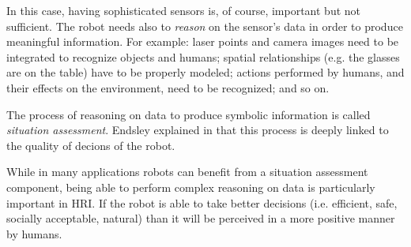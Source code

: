In this case, having sophisticated sensors is, of course, important but not sufficient. The robot needs also to \textit{reason} on the sensor's data in order to produce meaningful information. For example: laser points and camera images need to be integrated to recognize objects and humans; spatial relationships  (e.g. the glasses are on the table) have to be properly modeled; actions performed by humans, and their effects on the environment, need to be recognized; and so on. 

The process of reasoning on data to produce symbolic information is called \textit{situation assessment}. Endsley explained in \cite{endsley1995toward} that this process is deeply linked to the quality of  decions of the robot.

While in many applications robots can benefit from a situation assessment component, being able to perform complex reasoning on data is particularly important in HRI. If the robot is able to take better decisions (i.e.  efficient, safe, socially acceptable, natural) than it will be perceived in a more positive manner by humans. 




 
 

